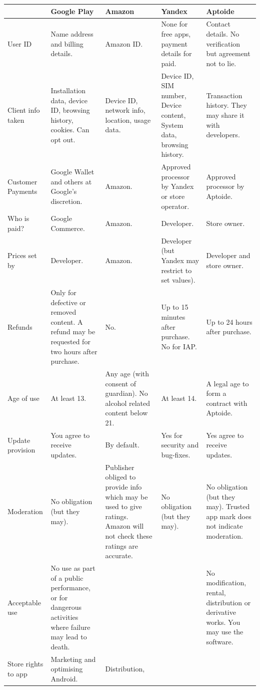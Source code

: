 \documentclass[thesis.tex]{subfiles}
\begin{document}
\begin{table}\footnotesize
  \begin{tabulary}{\linewidth}{lLLLL}
    \toprule
    & Google Play & Amazon & Yandex & Aptoide\\
    \midrule
    User ID & Name address and billing details. & Amazon ID. & None for free
    apps, payment details for paid. & Contact details. No verification but
    agreement not to lie.\\
    Client info taken & Installation data, device ID, browsing history,
    cookies. Can opt out. & Device ID, network info, location, usage data. &
    Device ID, SIM number, Device content, System data, browsing history. &
    Transaction history. They may share it with developers.\\
    Customer Payments & Google Wallet and others at Google's discretion. &
    Amazon. & Approved processor by Yandex or store operator. & Approved
    processor by Aptoide.\\
    Who is paid? & Google Commerce. & Amazon. & Developer. & Store
    owner.\\
    Prices set by & Developer. & Amazon. & Developer (but Yandex may
    restrict to set values). & Developer and store owner.\\
    Refunds & Only for defective or removed content. A refund may be
    requested for two hours after purchase. & No. & Up to 15 minutes after
    purchase. No for IAP. & Up to 24 hours after purchase.\\
    Age of use & At least 13. & Any age (with consent of guardian). No
    alcohol related content below 21. & At least 14. & A legal age to form a
    contract with Aptoide.\\
    Update provision & You agree to receive updates. & By default. & Yes for
    security and bug-fixes. & Yes agree to receive updates.\\
    Moderation & No obligation (but they may). & Publisher obliged to
    provide info which may be used to give ratings. Amazon will not check
    these ratings are accurate. & No obligation (but they may). & No
    obligation (but they may). Trusted app mark does not indicate
    moderation.\\
    Acceptable use & No use as part of a public performance, or for
    dangerous activities where failure may lead to death. & & & No
    modification, rental, distribution or derivative works. You may use the
    software.\\
    Store rights to app & Marketing and optimising Android. & Distribution,

\end{tabulary}
\end{table}
\end{document}
